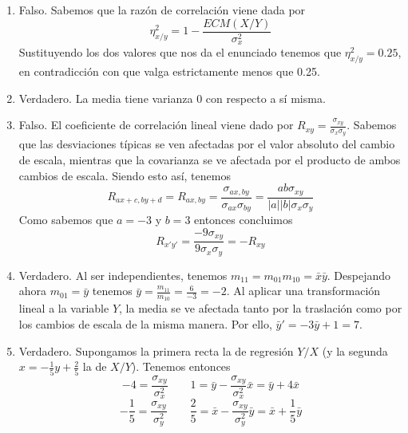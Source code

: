 \documentclass[fleqn]{article}
\begin{document}
\begin{enumerate}
\begin{enumerate}
                                \item Falso. Sabemos que la razón de correlación viene dada por
                                                $$\eta_{x/y} ^2 = 1 - \frac{ECM(X/Y)}{\sigma_x^2}$$
                                                Sustituyendo los dos valores que nos da el enunciado tenemos que $\eta_{x/y} ^2 = 0.25$, en contradicción con que 
                                                valga estrictamente menos que 0.25.
                                \item Verdadero. La media tiene varianza 0 con respecto a sí misma.
                                \item Falso. El coeficiente de correlación lineal viene dado por $R_{xy} = \frac{\sigma_{xy}}{\sigma_x \sigma_y}$. Sabemos que las 
                                                desviaciones típicas se ven afectadas por el valor absoluto del cambio de escala, mientras que la covarianza 
                                                se ve afectada por el producto de ambos cambios de escala. Siendo esto así, tenemos
                                                $$R_{ax+c, by+d} = R_{ax, by} = \frac{\sigma_{ax, by}}{\sigma_{ax} \sigma_{by}} = \frac{ab\sigma_{xy}}{|a||b|\sigma_{x} \sigma_{y}}$$
                                                Como sabemos que $a=-3$ y $b=3$ entonces concluimos
                                                $$R_{x'y'} = \frac{-9\sigma_{xy}}{9 \sigma_{x} \sigma_{y}} = -R_{xy}$$
                                \item Verdadero. Al ser independientes, tenemos $m_{11} = m_{01} m_{10} = \bar{x} \bar{y}$. Despejando ahora $m_{01} = \bar{y}$ tenemos
                                                $\bar{y} = \frac{m_{11}}{m_{10}} = \frac{6}{-3} = -2$. Al aplicar una transformación lineal a la variable $Y$, la media 
                                                se ve afectada tanto por la traslación como por los cambios de escala de la misma manera. Por ello, $\bar{y}' = -3 \bar{y} + 1 = 7$.
                                \item Verdadero. Supongamos la primera recta la de regresión $Y/X$ (y la segunda $ x = -\frac{1}{5}y +\frac{2}{5}$ la de $X/Y$). Tenemos entonces 
                                                $$ -4 = \frac{\sigma_{xy}}{\sigma_x^2} \quad \quad 1 = \bar{y} - \frac{\sigma_{xy}}{\sigma_x^2} \bar{x} = \bar{y} + 4 \bar{x}$$
                                                $$ -\frac{1}{5} = \frac{\sigma_{xy}}{\sigma_y^2} \quad \quad \frac{2}{5} = \bar{x} - \frac{\sigma_{xy}}{\sigma_y^2} \bar{y} = \bar{x} + \frac{1}{5} \bar{y} $$

\end{enumerate}
\end{enumerate}
\end{document}
